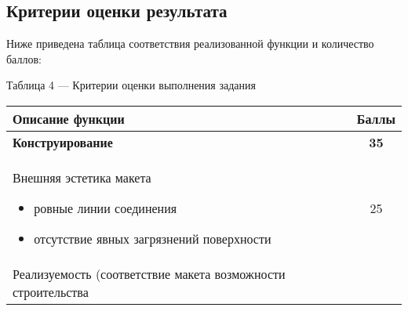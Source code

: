 \subsection*{Критерии оценки результата}

Ниже приведена таблица соответствия реализованной функции и количество баллов:
\begin{table}[H]
    Таблица 4 — Критерии оценки выполнения задания
    \begin{tabular}{|p{14cm}|c|}
        \hline
        Описание функции&Баллы \\
        \hline
        \hline
        \textbf{Конструирование}	& \textbf{35} \\
        \hline
        Внешняя эстетика макета 

        \begin{itemize}
            \item ровные линии соединения 
            \item отсутствие явных загрязнений поверхности       
        \end{itemize}  & 25 \\
        \hline
        Реализуемость (соответствие макета возможности строительства 
        

\end{tabular}
\end{table}
